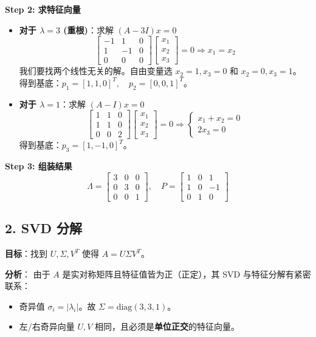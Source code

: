 \documentclass[11pt,a4paper]{ctexart}
\theoremstyle{definition}
\theoremstyle{remark}
\begin{document}
\textbf{Step 2: 求特征向量}
\begin{itemize}
    \item \textbf{对于 $\lambda = 3$ (重根)}：求解 $(A - 3I)x = 0$
    \[
    \begin{bmatrix} -1 & 1 & 0 \\ 1 & -1 & 0 \\ 0 & 0 & 0 \end{bmatrix} \begin{bmatrix} x_1 \\ x_2 \\ x_3 \end{bmatrix} = 0 \Rightarrow x_1 = x_2
    \]
    我们要找两个线性无关的解。自由变量选 $x_2=1, x_3=0$ 和 $x_2=0, x_3=1$。
    得到基底：$p_1 = [1, 1, 0]^T, \quad p_2 = [0, 0, 1]^T$。
    
    \item \textbf{对于 $\lambda = 1$}：求解 $(A - I)x = 0$
    \[
    \begin{bmatrix} 1 & 1 & 0 \\ 1 & 1 & 0 \\ 0 & 0 & 2 \end{bmatrix} \begin{bmatrix} x_1 \\ x_2 \\ x_3 \end{bmatrix} = 0 \Rightarrow \begin{cases} x_1 + x_2 = 0 \\ 2x_3 = 0 \end{cases}
    \]
    得到基底：$p_3 = [1, -1, 0]^T$。
\end{itemize}

\textbf{Step 3: 组装结果}
\[
\Lambda = \begin{bmatrix} 3 & 0 & 0 \\ 0 & 3 & 0 \\ 0 & 0 & 1 \end{bmatrix}, \quad
P = \begin{bmatrix} 1 & 0 & 1 \\ 1 & 0 & -1 \\ 0 & 1 & 0 \end{bmatrix}
\]

\subsection{2. SVD 分解}
\textbf{目标}：找到 $U, \Sigma, V^T$ 使得 $A = U \Sigma V^T$。

\textbf{分析}：
由于 $A$ 是实对称矩阵且特征值皆为正（正定），其 SVD 与特征分解有紧密联系：
\begin{itemize}
    \item 奇异值 $\sigma_i = |\lambda_i|$。故 $\Sigma = \text{diag}(3, 3, 1)$。
    \item 左/右奇异向量 $U, V$ 相同，且必须是\textbf{单位正交}的特征向量。
\end{itemize}
\end{document}
